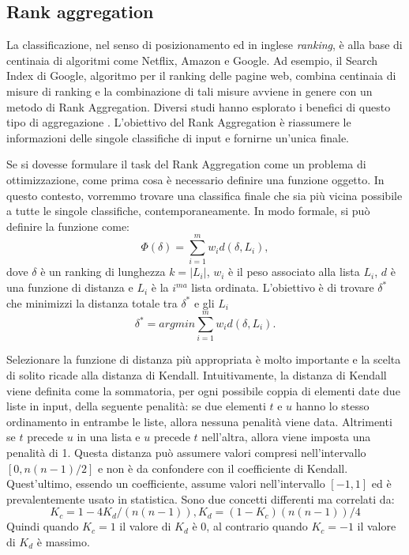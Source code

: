 \subsection{Rank aggregation}
La classificazione, nel senso di posizionamento ed in inglese \textit{ranking}, è alla base di centinaia di algoritmi come Netflix, Amazon e Google. 
Ad esempio, il Search Index di Google, algoritmo per il ranking delle pagine web, combina centinaia di misure di ranking e la combinazione di tali misure avviene in genere con un metodo di Rank Aggregation. Diversi studi hanno esplorato i benefici di questo tipo di aggregazione \cite{https://doi.org/10.48550/arxiv.2206.12088,https://doi.org/10.48550/arxiv.2202.05433}.
L'obiettivo del Rank Aggregation è riassumere le informazioni delle singole classifiche di input e fornirne un'unica finale. 

Se si dovesse formulare il task del Rank Aggregation come un problema di ottimizzazione, come prima cosa è necessario definire una funzione oggetto. In questo contesto, vorremmo trovare una classifica finale che sia più vicina possibile a tutte le singole classifiche, contemporaneamente. In modo formale, si può definire la funzione come: \[ \Phi(\delta) = \sum_{i=1}^{m} w_id(\delta,L_i), \]	
dove $\delta$ è un ranking di lunghezza $k=|L_i|$, $w_i$ è il peso associato alla lista $L_i$, $d$ è una funzione di distanza e $L_i$ è la $i^{ma}$ lista ordinata.
L'obiettivo è di trovare $\delta^*$ che minimizzi la distanza totale tra $\delta^*$ e gli $L_i$
\[ \delta^* = arg min \sum_{i=1}^{m} w_id(\delta,L_i). \]

Selezionare la funzione di distanza più appropriata è molto importante e la scelta di solito ricade alla distanza di Kendall.
Intuitivamente, la distanza di Kendall viene definita come la sommatoria, per ogni possibile coppia di elementi date due liste in input, della seguente penalità: se due elementi $t$ e $u$ hanno lo stesso ordinamento in entrambe le liste, allora nessuna penalità viene data. Altrimenti se $t$ precede $u$ in una lista e $u$ precede $t$ nell'altra, allora viene imposta una penalità di 1.
Questa distanza può assumere valori compresi nell'intervallo $[0,n(n-1)/2]$ e non è da confondere con il coefficiente di Kendall. Quest'ultimo, essendo un coefficiente, assume valori nell'intervallo $[-1,1]$ ed è prevalentemente usato in statistica. Sono due concetti differenti ma correlati da:
\[K_c=1-4K_d/(n(n-1)), K_d = (1-K_c)(n(n-1))/4\]
Quindi quando $K_c=1$ il valore di $K_d$ è 0, al contrario quando $K_c=-1$ il valore di $K_d$ è massimo.

